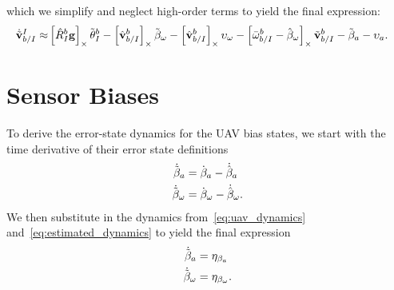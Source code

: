 which we simplify and neglect high-order terms to yield the final
expression:
\begin{align}
  \dot{\tilde{\mathrm{\mathbf{v}}}}_{b/I}^I
  \approx&
  \left[  \hat{R}_I^b \mathrm{\mathbf{g}}  \right]_{\times} \tilde{\mathrm{\mathbf{\theta}}}_I^b 
  -
  \left[  \hat{\mathrm{\mathbf{v}}}_{b/I}^b  \right]_{\times} \tilde{\mathrm{\mathbf{\beta}}}_\omega
  -
  \left[  \hat{\mathrm{\mathbf{v}}}_{b/I}^b  \right]_{\times} \mathrm{\mathbf{\upsilon}}_\omega
  -
  \left[  \bar{\omega}_{b/I}^b - \hat{\mathrm{\mathbf{\beta}}}_\omega  \right]_{\times}
  \tilde{\mathrm{\mathbf{v}}}_{b/I}^b
  -
  \tilde{\mathrm{\mathbf{\beta}}}_a
  -
  \mathrm{\mathbf{\upsilon}}_a.
\end{align}

\section{Sensor Biases}
To derive the error-state dynamics for the UAV bias states, we start with the
time derivative of their error state definitions
\begin{align}
  \dot{\tilde{\mathrm{\mathbf{\beta}}}}_a &= \dot{\mathrm{\mathbf{\beta}}}_a -
  \dot{\hat{\mathrm{\mathbf{\beta}}}}_a \\
  \dot{\tilde{\mathrm{\mathbf{\beta}}}}_\omega &= \dot{\mathrm{\mathbf{\beta}}}_\omega -
  \dot{\hat{\mathrm{\mathbf{\beta}}}}_\omega.
\end{align}
We then substitute in the dynamics from~\eqref{eq:uav_dynamics}
and~\eqref{eq:estimated_dynamics} to yield the final expression
\begin{align}
  \dot{\tilde{\mathrm{\mathbf{\beta}}}}_a &= \mathrm{\mathbf{\eta}}_{\beta_a} \\
  \dot{\tilde{\mathrm{\mathbf{\beta}}}}_\omega &= \mathrm{\mathbf{\eta}}_{\beta_\omega}.
\end{align}

